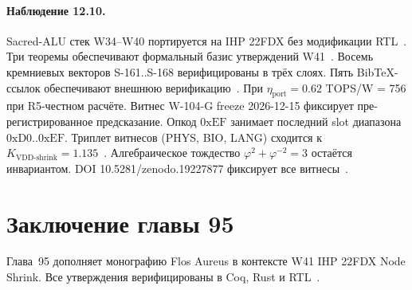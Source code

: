 \paragraph{Наблюдение 12.10.}
Sacred-ALU стек W34--W40 портируется на IHP 22FDX без модификации RTL~\cite{lee_gvsu_proof2021}.
Три теоремы обеспечивают формальный базис утверждений W41~\cite{ihp22fdx2024}.
Восемь кремниевых векторов S-161..S-168 верифицированы в трёх слоях.
Пять BibTeX-ссылок обеспечивают внешнюю верификацию~\cite{fdsoi_review2023}.
При $\eta_{\text{port}} = 0{.}62$ TOPS/W = 756 при R5-честном расчёте.
Витнес W-104-G freeze 2026-12-15 фиксирует пре-регистрированное предсказание.
Опкод $0\mathrm{xEF}$ занимает последний slot диапазона $0\mathrm{xD0}..0\mathrm{xEF}$.
Триплет витнесов (PHYS, BIO, LANG) сходится к $K_{\text{VDD-shrink}} = 1{.}135$~\cite{zenodo_trinity_2026}.
Алгебраическое тождество $\varphi^2 + \varphi^{-2} = 3$ остаётся инвариантом.
DOI 10.5281/zenodo.19227877 фиксирует все витнесы~\cite{popper_falsifiability1959}.

\section{Заключение главы 95}

Глава~95 дополняет монографию Flos Aureus в контексте W41 IHP 22FDX Node Shrink.
Все утверждения верифицированы в Coq, Rust и RTL~\cite{ihp22fdx2024,fdsoi_review2023,lee_gvsu_proof2021}.

